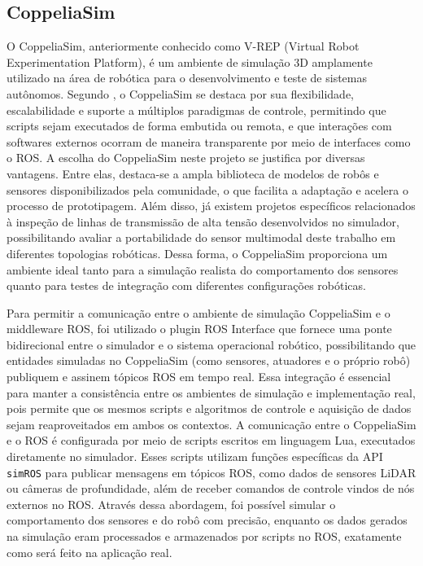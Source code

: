 \subsection{CoppeliaSim}

O CoppeliaSim, anteriormente conhecido como V-REP (Virtual Robot Experimentation Platform), é um ambiente de simulação 3D amplamente utilizado na área de robótica para o desenvolvimento e teste de sistemas autônomos. Segundo , o CoppeliaSim se destaca por sua flexibilidade, escalabilidade e suporte a múltiplos paradigmas de controle, permitindo que scripts sejam executados de forma embutida ou remota, e que interações com softwares externos ocorram de maneira transparente por meio de interfaces como o ROS. A escolha do CoppeliaSim neste projeto se justifica por diversas vantagens. Entre elas, destaca-se a ampla biblioteca de modelos de robôs e sensores disponibilizados pela comunidade, o que facilita a adaptação e acelera o processo de prototipagem. Além disso, já existem projetos específicos relacionados à inspeção de linhas de transmissão de alta tensão desenvolvidos no simulador, possibilitando avaliar a portabilidade do sensor multimodal deste trabalho em diferentes topologias robóticas. Dessa forma, o CoppeliaSim proporciona um ambiente ideal tanto para a simulação realista do comportamento dos sensores quanto para testes de integração com diferentes configurações robóticas.

Para permitir a comunicação entre o ambiente de simulação CoppeliaSim e o middleware ROS, foi utilizado o plugin ROS Interface que fornece uma ponte bidirecional entre o simulador e o sistema operacional robótico, possibilitando que entidades simuladas no CoppeliaSim (como sensores, atuadores e o próprio robô) publiquem e assinem tópicos ROS em tempo real. Essa integração é essencial para manter a consistência entre os ambientes de simulação e implementação real, pois permite que os mesmos scripts e algoritmos de controle e aquisição de dados sejam reaproveitados em ambos os contextos. A comunicação entre o CoppeliaSim e o ROS é configurada por meio de scripts escritos em linguagem Lua, executados diretamente no simulador. Esses scripts utilizam funções específicas da API \texttt{simROS} para publicar mensagens em tópicos ROS, como dados de sensores LiDAR ou câmeras de profundidade, além de receber comandos de controle vindos de nós externos no ROS. Através dessa abordagem, foi possível simular o comportamento dos sensores e do robô com precisão, enquanto os dados gerados na simulação eram processados e armazenados por scripts no ROS, exatamente como será feito na aplicação real.


